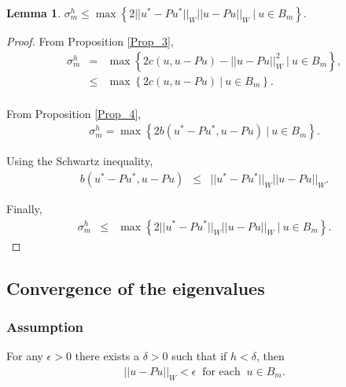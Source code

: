 \documentclass[../../main.tex]{subfiles}
\begin{document}
\newtheorem{Lem_2}[Lem_1]{Lemma} 
\begin{Lem_2}
	\label{Lem_2}
	$\sigma_{m}^{h} \leq \max \left\{2||u^{*}- Pu^{*}||_{W} ||u-Pu||_{W} \ | \ u \in B_{m} \right\}.$
\end{Lem_2}
\begin{proof}
	From Proposition \ref{Prop_3},
	\begin{eqnarray*}
		\sigma_{m}^{h} & = & \max\left\{ 2c( u,u-Pu )-||u-Pu||_{W}^{2} \ | \ u \in B_{m} \right\}, \\
					& \leq & \max\left\{ 2c( u,u-Pu ) \ | \ u \in B_{m} \right\}. \\
	\end{eqnarray*}

	From Proposition \ref{Prop_4}, 
	\begin{eqnarray*}
		\sigma_{m}^{h} = \max\left\{ 2 b(u^{*}-Pu^{*}, u-Pu) \ | \ u \in B_{m} \right\}.
	\end{eqnarray*}

	Using the Schwartz inequality,
	\begin{eqnarray*}
		b(u^{*} - Pu^{*}, u -Pu) & \leq & ||u^{*} - Pu^{*}||_{W}||u -Pu||_{W}.
	\end{eqnarray*}

	Finally,
	\begin{eqnarray*}
		\sigma_{m}^{h} & \leq & \max\left\{ 2||u^{*}- Pu^{*}||_{W} ||u-Pu||_{W} \ | \ u \in B_{m} \right\}.
	\end{eqnarray*}
\end{proof}

\subsection{Convergence of the eigenvalues}

\subsubsection*{Assumption}
For any $\epsilon > 0$ there exists a $\delta > 0$ such that if $h<\delta$, then
\begin{eqnarray*}
||u-Pu||_{W} < \epsilon \ \textrm{ for each } \ u \in B_{m}.
\end{eqnarray*}
\end{document}
